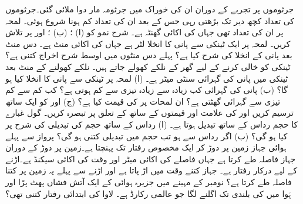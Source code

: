 جرثوموں پر تجربے کے دوران ان کی خوراک میں جرثومہ مار دوا ملائی گئی۔جرثوموں کی تعداد کچھ دیر تک بڑھتی رہی جس کے بعد ان کی تعداد کم ہونا شروع ہوئی۔ لمحہ  پر ان کی تعداد  تھی جہاں  کی اکائی گھنٹہ ہے۔ شرح نمو کو (ا) ؛ (ب) ؛ اور  پر تلاش کریں۔  
لمحہ  پر ایک ٹینکی سے پانی کا انخلا  لٹر ہے جہاں  کی اکائی منٹ ہے۔ دس منٹ بعد پانی کے انخلا کی شرح کیا ہے؟ پہلے دس منٹوں میں اوسط شرح اخراج کتنی ہے؟ 
ٹینکی کو خالی کرنے کے لیے گھر کے نلکے کھولے جاتے ہیں۔ نلکے کھولنے کے  منٹ بعد ٹینکی میں پانی کی گہرائی  سنٹی میٹر ہے۔ (ا) لمحہ  پر ٹینکی سے پانی کا انخلا  کیا ہو گا؟ (ب) پانی کی گہرائی کب زیادہ سے زیادہ تیزی سے کم ہوتی ہے؟ کب کم سے کم تیزی سے گہرائی گھٹتی ہے؟ ان لمحات پر  کی قیمت کیا ہے؟ (ج)  اور  کو ایک ساتھ ترسیم کریں اور  کی علامت اور قیمتوں کے ساتھ  کے تعلق پر تبصرہ کریں۔
گول غبارے کا حجم   رداس  کے ساتھ تبدیل ہوتا ہے۔ (ا) رداس کے ساتھ حجم کی تبدیلی کی شرح  پر کیا ہو گی؟ (ب) اگر رداس  سے  ہو تب حجم میں تبدیلی کتنی ہو گی؟
پرواز سے پہلے ہوائی جہاز زمین پر دوڑ کر ایک مخصوص رفتار تک پہنچتا ہے۔زمین پر دوڑ کے دوران  جہاز  فاصلہ طے کرتا ہے جہاں فاصلے کی اکائی میٹر اور وقت کی اکائی سیکنڈ ہے۔اڑنے کے لیے درکار رفتار  ہے۔ جہاز کتنے وقت میں اڑ پاتا ہے اور اڑنے سے پہلے یہ زمین پر کتنا فاصلہ طے کرتا ہے؟
  نومبر کے مہینے میں جزیرہ ہوائی کے ایک آتش فشاں پھٹ پڑا اور ہَوا میں  کی بلندی تک اگلنے لگا جو عالمی رکارڈ ہے۔ لاوا کی ابتدائی رفتار کتنی تھی؟  


